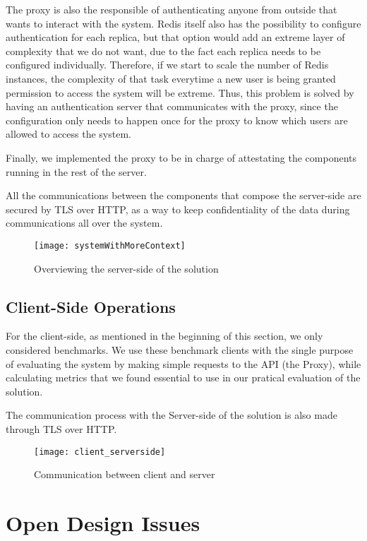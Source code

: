 The proxy is also the responsible of authenticating anyone from outside that wants to interact with the system. Redis itself also has the possibility to configure authentication for each replica, but that option would add an extreme layer of complexity that we do not want, due to the fact each replica needs to be configured individually. Therefore, if we start to scale the number of Redis instances, the complexity of that task everytime a new user is being granted permission to access the system will be extreme. Thus, this problem is solved by having an authentication server that communicates with the proxy, since the configuration only needs to happen once for the proxy to know which users are allowed to access the system.

Finally, we implemented the proxy to be in charge of attestating the components running in the rest of the server. 

All the communications between the components that compose the server-side are secured by TLS over HTTP, as a way to keep confidentiality of the data during communications all over the system.

\begin{figure}[htbp]
	\centering
	{\texttt{[image: systemWithMoreContext]}}
	\caption{Overviewing the server-side of the solution}
	\label{fig:serverside_systemModel}
\end{figure}

  
\subsection{Client-Side Operations}

For the client-side, as mentioned in the beginning of this section, we only considered benchmarks. We use these benchmark clients with the single purpose of evaluating the system by making simple requests to the API (the Proxy), while calculating metrics that we found essential to use in our pratical evaluation of the solution. 

The communication process with the Server-side of the solution is also made through TLS over HTTP.

\begin{figure}[htbp]
	\centering
	{\texttt{[image: client\_serverside]}}
	\caption{Communication between client and server}
	\label{fig:client_serverModel}
\end{figure}

\section{Open Design Issues} %

